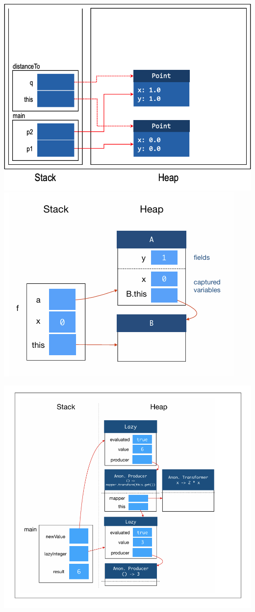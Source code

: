 \documentclass[10pt, landscape]{article}
\begin{document}
\begin{multicols}{2}
\begin{multicols}{2}
\includegraphics[scale=0.15]{sh2}
\includegraphics[scale=0.35]{sh4} 
\end{multicols}
\includegraphics[scale=0.35]{sh5}
\end{multicols}
\end{document}
